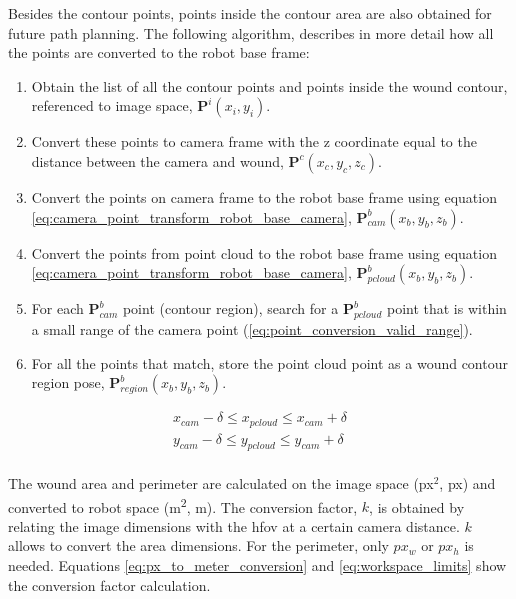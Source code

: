 Besides the contour points, points inside the contour area are also obtained for future path planning. The following algorithm, describes in more detail how all the points are converted to the robot base frame:

\begin{enumerate}
    \item Obtain the list of all the contour points and points inside the wound contour, referenced to image space, $\boldsymbol{P}^i(x_i, y_i)$.
    \item Convert these points to camera frame with the z coordinate equal to the distance between the camera and wound, $\boldsymbol{P}^c(x_c, y_c, z_c)$.
    \item Convert the points on camera frame to the robot base frame using equation \ref{eq:camera_point_transform_robot_base_camera}, $\boldsymbol{P}^b_{cam}(x_b, y_b, z_b)$.
    \item Convert the points from point cloud to the robot base frame using equation \ref{eq:camera_point_transform_robot_base_camera}, $\boldsymbol{P}^b_{pcloud}(x_b, y_b, z_b)$.
    \item For each $\boldsymbol{P}^b_{cam}$ point (contour region), search for a $\boldsymbol{P}^b_{pcloud}$ point that is within a small range of the camera point (\ref{eq:point_conversion_valid_range}).
    \item For all the points that match, store the point cloud point as a wound contour region pose, $\boldsymbol{P}^b_{region}(x_b, y_b, z_b)$.
\end{enumerate}

\begin{equation}
\label{eq:point_conversion_valid_range}
    \left.
    \begin{aligned}
    x_{cam} - \delta \le x_{pcloud} \le x_{cam} + \delta\\
    y_{cam} - \delta \le y_{pcloud} \le y_{cam} + \delta
    \end{aligned}
    \right.
\end{equation}\\

The wound area and perimeter are calculated on the image space (px$^2$, px) and converted to robot space (\si{\meter \squared}, \si{\meter}). The conversion factor, $k$, is obtained by relating the image dimensions with the \gls{hfov} at a certain camera distance. $k$ allows to convert the area dimensions. For the perimeter, only $px_w$ or $px_h$ is needed. Equations \ref{eq:px_to_meter_conversion} and \ref{eq:workspace_limits} show the conversion factor calculation.

